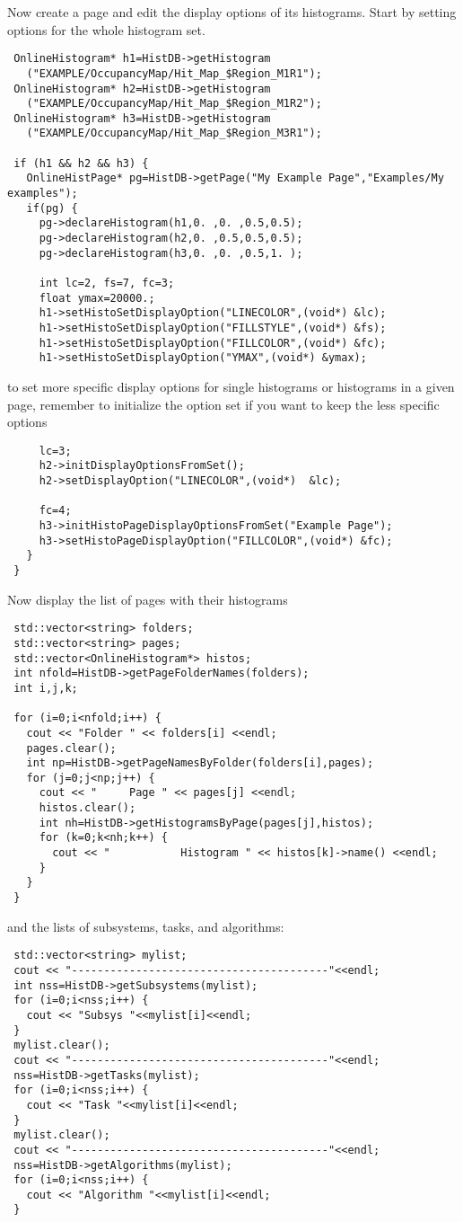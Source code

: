 \documentclass{lhcbnote}
\begin{document}
Now create a page and edit the display options of its
histograms. Start by setting options for the whole histogram set.
\begin{verbatim}
 OnlineHistogram* h1=HistDB->getHistogram
   ("EXAMPLE/OccupancyMap/Hit_Map_$Region_M1R1");
 OnlineHistogram* h2=HistDB->getHistogram
   ("EXAMPLE/OccupancyMap/Hit_Map_$Region_M1R2");
 OnlineHistogram* h3=HistDB->getHistogram
   ("EXAMPLE/OccupancyMap/Hit_Map_$Region_M3R1");

 if (h1 && h2 && h3) {
   OnlineHistPage* pg=HistDB->getPage("My Example Page","Examples/My examples");
   if(pg) {
     pg->declareHistogram(h1,0. ,0. ,0.5,0.5);
     pg->declareHistogram(h2,0. ,0.5,0.5,0.5);
     pg->declareHistogram(h3,0. ,0. ,0.5,1. );
   
     int lc=2, fs=7, fc=3;
     float ymax=20000.;
     h1->setHistoSetDisplayOption("LINECOLOR",(void*) &lc);
     h1->setHistoSetDisplayOption("FILLSTYLE",(void*) &fs);
     h1->setHistoSetDisplayOption("FILLCOLOR",(void*) &fc); 
     h1->setHistoSetDisplayOption("YMAX",(void*) &ymax); 
\end{verbatim}
to set more specific display options for single histograms or
histograms in a given page, remember to initialize the option set if
you want to keep the less specific options
\begin{verbatim}
     lc=3;
     h2->initDisplayOptionsFromSet();
     h2->setDisplayOption("LINECOLOR",(void*)  &lc);

     fc=4;
     h3->initHistoPageDisplayOptionsFromSet("Example Page");
     h3->setHistoPageDisplayOption("FILLCOLOR",(void*) &fc);
   }
 }
\end{verbatim}
Now display the list of pages with their histograms
\begin{verbatim}
 std::vector<string> folders;
 std::vector<string> pages;
 std::vector<OnlineHistogram*> histos; 
 int nfold=HistDB->getPageFolderNames(folders);
 int i,j,k;

 for (i=0;i<nfold;i++) {
   cout << "Folder " << folders[i] <<endl;
   pages.clear();
   int np=HistDB->getPageNamesByFolder(folders[i],pages);
   for (j=0;j<np;j++) {
     cout << "     Page " << pages[j] <<endl;
     histos.clear();
     int nh=HistDB->getHistogramsByPage(pages[j],histos);
     for (k=0;k<nh;k++) {
       cout << "           Histogram " << histos[k]->name() <<endl;
     }    
   }
 }
\end{verbatim}
and the lists of subsystems, tasks, and algorithms:
\begin{verbatim}
 std::vector<string> mylist;
 cout << "----------------------------------------"<<endl;
 int nss=HistDB->getSubsystems(mylist);
 for (i=0;i<nss;i++) {
   cout << "Subsys "<<mylist[i]<<endl;
 }
 mylist.clear();
 cout << "----------------------------------------"<<endl;
 nss=HistDB->getTasks(mylist);
 for (i=0;i<nss;i++) {
   cout << "Task "<<mylist[i]<<endl;
 }
 mylist.clear();
 cout << "----------------------------------------"<<endl;
 nss=HistDB->getAlgorithms(mylist);
 for (i=0;i<nss;i++) {
   cout << "Algorithm "<<mylist[i]<<endl;
 }
\end{verbatim}
\end{document}
